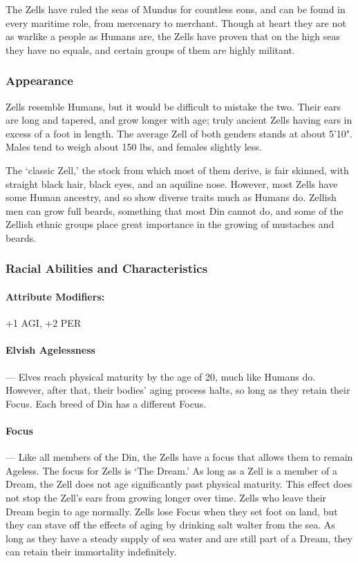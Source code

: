\documentclass[oneside,11pt,english]{book}
\begin{document}
The Zells have ruled the seas of Mundus for countless eons, and can be found in every maritime role, from mercenary to merchant. Though at heart they are not as warlike a people as Humans are, the Zells have proven that on the high seas they have no equals, and certain groups of them are highly militant.

\subsubsection*{Appearance} 
Zells resemble Humans, but it would be difficult to mistake the two. Their ears are long and tapered, and grow longer with age; truly ancient Zells having ears in excess of a foot in length. 
The average Zell of both genders stands at about 5'10". Males tend to weigh about 150 lbs, and females slightly less.


The ‘classic Zell,’ the stock from which most of them derive, is fair skinned, with straight black hair, black eyes, and an aquiline nose. However, most Zells have some Human ancestry, and so show diverse traits much as Humans do. Zellish men can grow full beards, something that most Din cannot do, and some of the Zellish ethnic groups place great importance in the growing of mustaches and beards.


\subsubsection*{Racial Abilities and Characteristics} 
\paragraph{Attribute Modifiers:} +1 AGI, +2 PER 

\paragraph{Elvish Agelessness}---\quad
Elves reach physical maturity by the age of 20, much like Humans do. However, after that, their 
bodies' aging process halts, so long as they retain their Focus. Each breed of Din has a different 
Focus. 


\paragraph{Focus}---\quad
Like all members of the Din, the Zells have a focus that allows them to remain Ageless. The focus for Zells is ‘The Dream.’ As long as a Zell is a member of a Dream, the Zell does not age significantly past physical maturity. This effect does not stop the Zell's ears from growing longer over time. Zells who leave their Dream begin to age normally. 
Zells lose Focus when they set foot on land, but they can stave off the effects of aging by drinking salt walter from the sea. As long as they have a steady supply of sea water and are still part of a Dream, they can retain their immortality indefinitely.
\end{document}
